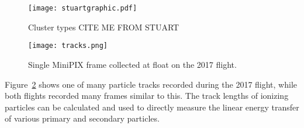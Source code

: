 %
%
\begin{figure}[H]
\centering
\texttt{[image: stuartgraphic.pdf]}
\caption{Cluster types CITE ME FROM STUART} %
\label{fig:stuartfigure}
\end{figure}
%
%
\begin{figure}[H]
\centering
\texttt{[image: tracks.png]} %
\caption{Single MiniPIX frame collected at float on the 2017 flight.}
\label{fig:frame1}
\end{figure}
Figure~\ref{fig:frame1} shows one of many particle tracks recorded during the 2017 flight, while both flights recorded many frames similar to this.  The track lengths of ionizing particles can be calculated and used to directly measure the linear energy transfer of various primary and secondary particles.


